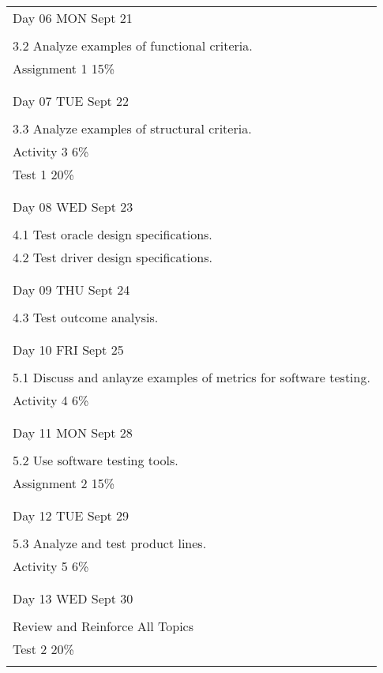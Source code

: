 \begin{longtable}{ l  }
    \\          Day 06 MON Sept 21 \\ \\ 
            3.2 Analyze examples of functional criteria. \\
            Assignment 1  15\% \\ \\ 
      \hline   
     \\        Day 07 TUE Sept 22 \\ \\ 
         3.3 Analyze examples of structural criteria. \\
            Activity 3  6\% \\
           Test  1  20\%  \\ \\ 
      \hline   
    \\          Day 08 WED Sept 23 \\ \\ 
            4.1 Test oracle design specifications. \\
            4.2 Test driver design specifications. \\ \\ 
       \hline  
    \\         Day 09 THU Sept 24 \\ \\ 
            4.3 Test outcome analysis. \\ \\ 
       \hline  
    \\          Day 10 FRI Sept 25 \\ \\ 
            5.1 Discuss and anlayze examples of metrics for software testing. \\
            Activity 4  6\% \\ \\ 
      \hline   
    
    \\          Day 11 MON Sept 28 \\ \\ 
            5.2 Use software testing tools. \\
            Assignment 2 15\% \\ \\ 
      \hline   
    \\          Day 12 TUE Sept 29 \\ \\ 
            5.3 Analyze and test product lines. \\
            Activity 5  6\% \\ \\ 
    \hline     
    \\          Day 13 WED Sept 30 \\ \\ 
            Review and Reinforce All Topics \\
            Test  2 20\%  \\ \\ 
      
\end{longtable}
\newpage